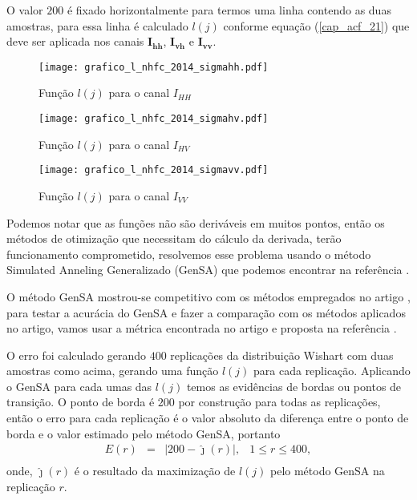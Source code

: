 	O valor $200$ é fixado horizontalmente para termos uma linha contendo as duas amostras, para essa linha é calculado $l(j)$ conforme equação (\ref{cap_acf_21}) que deve ser aplicada nos canais $\mathbf{I_{hh}}$, $\mathbf{I_{vh}}$ e $\mathbf{I_{vv}}$.  
\begin{figure}[hbt]
  \texttt{[image: grafico\_l\_nhfc\_2014\_sigmahh.pdf]}
	\caption{Função $l(j)$ para o canal $I_{HH}$}\label{cap_acf_fig04}
\endminipage\hfill
{}
  \texttt{[image: grafico\_l\_nhfc\_2014\_sigmahv.pdf]}
	\caption{Função $l(j)$ para o canal $I_{HV}$}\label{cap_acf_fig05}
\endminipage\hfill
\centering
{}
  \texttt{[image: grafico\_l\_nhfc\_2014\_sigmavv.pdf]}
	\caption{Função $l(j)$ para o canal $I_{VV}$}\label{cap_acf_fig06}
\endminipage\hfill
\end{figure}

	Podemos notar que as funções não são deriváveis em muitos pontos, então os métodos de otimização que necessitam do cálculo da derivada, terão funcionamento comprometido, resolvemos esse problema usando o método Simulated Anneling Generalizado (GenSA) que podemos encontrar na referência \citep{xgsh}.
	
	O método GenSA mostrou-se competitivo com os métodos empregados no artigo \citet{nhfc}, para testar a acurácia do GenSA e fazer a comparação com os métodos aplicados no artigo, vamos usar a métrica encontrada no artigo \citep{nhfc} e proposta na referência \citep{fbgm}.
        
	O erro foi calculado gerando $400$ replicações da distribuição Wishart com duas amostras como acima, gerando uma função $l(j)$ para cada replicação. Aplicando o GenSA para cada umas das $l(j)$ temos as evidências de bordas ou pontos de transição. O ponto de borda é $200$ por construção para todas as replicações, então o erro para cada replicação é o valor absoluto da diferença entre o ponto de borda e o valor estimado pelo método GenSA, portanto  
\begin{equation}\label{cap_acf_26}
\begin{array}{llll}
	E(r) &=& |200 - \hat{\jmath}(r)|, & 1\leq r \leq 400,  \\
\end{array}
\end{equation}
onde, $\hat{\jmath}(r)$ é o resultado da maximização de $l(j)$ pelo método GenSA na replicação $r$.


